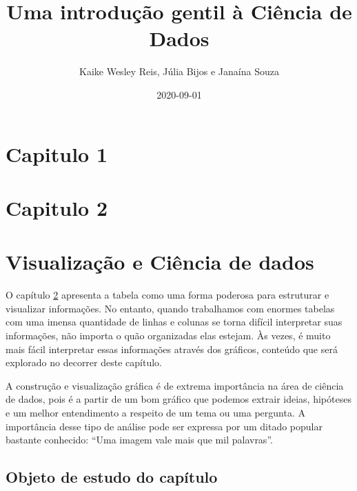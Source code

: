 \documentclass[
  oneside]{book}
\title{Uma introdução gentil à Ciência de Dados}
\author{Kaike Wesley Reis, Júlia Bijos e Janaína Souza}
\date{2020-09-01}
\newenvironment{Shaded}{\begin{snugshade}}{\end{snugshade}}
\newcommand{\DataTypeTok}[1]{\textcolor[rgb]{0.13,0.29,0.53}{#1}}
\newcommand{\KeywordTok}[1]{\textcolor[rgb]{0.13,0.29,0.53}{\textbf{#1}}}
\newcommand{\NormalTok}[1]{#1}
\newcommand{\OperatorTok}[1]{\textcolor[rgb]{0.81,0.36,0.00}{\textbf{#1}}}
\newcommand{\OtherTok}[1]{\textcolor[rgb]{0.56,0.35,0.01}{#1}}
\begin{document}
\maketitle

{
\setcounter{tocdepth}{1}
\tableofcontents
}
\begin{Shaded}
\end{Shaded}

\hypertarget{c01}{%
\chapter{Capitulo 1}\label{c01}}

\hypertarget{c02}{%
\chapter{Capitulo 2}\label{c02}}

\hypertarget{c03}{%
\chapter{Visualização e Ciência de dados}\label{c03}}

O capítulo \ref{c02} apresenta a tabela como uma forma poderosa para estruturar e visualizar informações. No entanto, quando trabalhamos com enormes tabelas com uma imensa quantidade de linhas e colunas se torna difícil interpretar suas informações, não importa o quão organizadas elas estejam. Às vezes, é muito mais fácil interpretar essas informações através dos gráficos, conteúdo que será explorado no decorrer deste capítulo.

A construção e visualização gráfica é de extrema importância na área de ciência de dados, pois é a partir de um bom gráfico que podemos extrair ideias, hipóteses e um melhor entendimento a respeito de um tema ou uma pergunta. A importância desse tipo de análise pode ser expressa por um ditado popular bastante conhecido: ``Uma imagem vale mais que mil palavras''.

\hypertarget{objeto-estudo}{%
\section{Objeto de estudo do capítulo}\label{objeto-estudo}}
\end{document}
